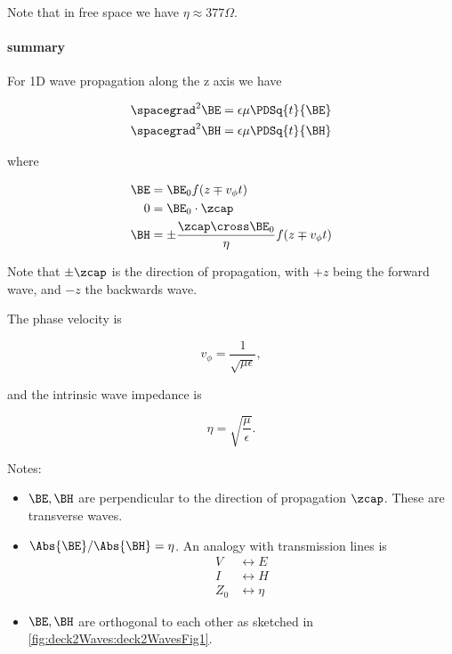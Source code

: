Note that in free space we have \( \eta \approx 377 \Omega \).

\paragraph{summary}

For 1D wave propagation along the z axis we have

\begin{equation}\label{eqn:uwavesLecture2:580}
\begin{aligned}
\spacegrad^2 \BE &= \epsilon \mu \PDSq{t}{\BE} \\
\spacegrad^2 \BH &= \epsilon \mu \PDSq{t}{\BH} \\
\end{aligned}
\end{equation}

where

\begin{equation}\label{eqn:uwavesLecture2:600}
\begin{aligned}
\BE &= \BE_0 f( z \mp v_\phi t ) \\
0 &= \BE_0 \cdot \zcap \\
\BH &= \pm \frac{\zcap \cross \BE_0}{\eta} f( z \mp v_\phi t )
\end{aligned}
\end{equation}

Note that \( \pm \zcap \) is the direction of propagation, with \( +z \) being the forward wave, and \( -z \) the backwards wave.

The phase velocity is

\begin{equation}\label{eqn:uwavesLecture2:620}
v_\phi = \frac{1}{\sqrt{\mu\epsilon}},
\end{equation}

and the intrinsic wave impedance is

\begin{equation}\label{eqn:uwavesLecture2:640}
\eta = \sqrt{\frac{\mu}{\epsilon}}.
\end{equation}

Notes:

\begin{itemize}
\item \( \BE, \BH \) are perpendicular to the direction of propagation \( \zcap \).  These are transverse waves.
\item \( \Abs{\BE}/\Abs{\BH} = \eta \).  An analogy with transmission lines is
\begin{equation}\label{eqn:uwavesLecture2:660}
\begin{aligned}
V &\leftrightarrow E \\
I &\leftrightarrow H \\
Z_0 &\leftrightarrow \eta
\end{aligned}
\end{equation}
\item \( \BE, \BH \) are orthogonal to each other as sketched in \cref{fig:deck2Waves:deck2WavesFig1}.

\end{itemize}

